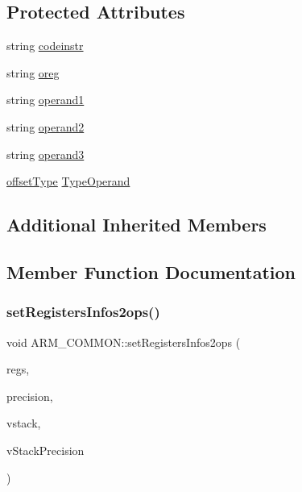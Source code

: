 \subsection*{Protected Attributes}
\begin{DoxyCompactItemize}
\item 
string \hyperlink{classARM__COMMON_afae3f682dc411db3912280e5fc53fdd4}{codeinstr}
\item 
string \hyperlink{classARM__COMMON_a6af2d514cf260ca734b75a621003def7}{oreg}
\item 
string \hyperlink{classARM__COMMON_ada8583b1c8914cac40a3c29f40211e68}{operand1}
\item 
string \hyperlink{classARM__COMMON_a7f35ac57d2949b7c5b255142dab7130f}{operand2}
\item 
string \hyperlink{classARM__COMMON_af5cc71acabd150ecfee97a132de88ceb}{operand3}
\item 
\hyperlink{arch_8h_a63b66e201ffc27bbc8f89c8808382044}{offset\+Type} \hyperlink{classARM__COMMON_a6bef177d4e532499ed708243c9bec81a}{Type\+Operand}
\end{DoxyCompactItemize}
\subsection*{Additional Inherited Members}


\subsection{Member Function Documentation}
\mbox{\label{classARM__COMMON_a74eb150144162a68438cde4911cf96f7}} 
\subsubsection{\texorpdfstring{set\+Registers\+Infos2ops()}{setRegistersInfos2ops()}}
{\footnotesize\ttfamily void A\+R\+M\+\_\+\+C\+O\+M\+M\+O\+N\+::set\+Registers\+Infos2ops (\begin{DoxyParamCaption}\item[{\hyperlink{DAAInstruction_8h_af0fae93a861de9cf37988d5673cac523}{reg\+Table} \&}]{regs,  }\item[{\hyperlink{DAAInstruction_8h_a0e8cae02815a5f8adc750122d790b455}{reg\+Precision\+Table} \&}]{precision,  }\item[{\hyperlink{DAAInstruction_8h_a1b0e70ac1a04f06c8132055ed01f589f}{stack\+Type} \&}]{vstack,  }\item[{\hyperlink{DAAInstruction_8h_ac5cb793e9dac3fa9693da78b7e29ab30}{stack\+Prec\+Type} \&}]{v\+Stack\+Precision }\end{DoxyParamCaption})\hspace{0.3cm}{\ttfamily [protected]}}

